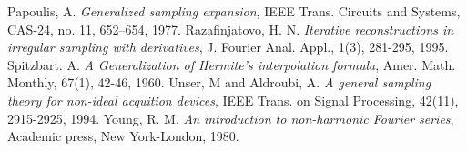 \documentclass[a4paper,12pt,reqno]{amsart}
\theoremstyle{plain}
\numberwithin{equation}{section}
\theoremstyle{definition}
\begin{document}
\begin{thebibliography}{150}
  Papoulis, A. \emph{Generalized sampling expansion},  IEEE Trans. Circuits and Systems, CAS-24, no. 11, 652–654, 1977.
Razafinjatovo, H. N. \emph{Iterative reconstructions in irregular sampling with derivatives}, J. Fourier Anal. Appl., 1(3), 281-295, 1995.
 Spitzbart. A. \emph{A Generalization of Hermite's interpolation formula}, Amer. Math. Monthly, 67(1), 42-46, 1960.
 Unser, M and Aldroubi, A. \emph{ A general sampling theory for non-ideal acquition devices}, IEEE Trans. on Signal Processing, 42(11), 2915-2925, 1994.
 Young, R. M. \emph{An introduction to non-harmonic Fourier series}, Academic press, New York-London, 1980.



\end{thebibliography}
\end{document}
